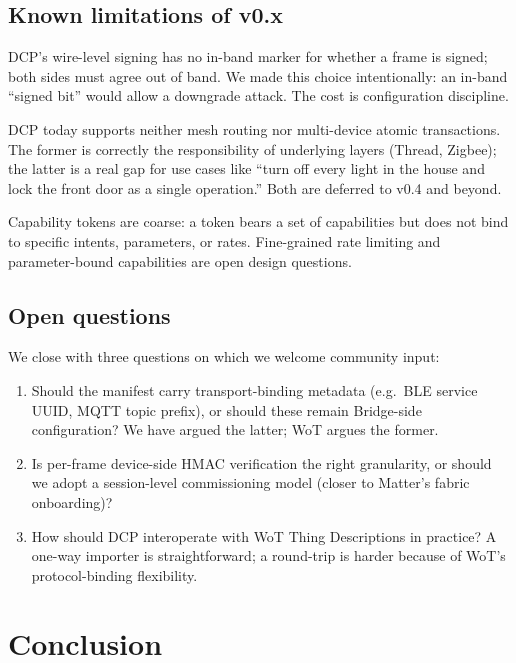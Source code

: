 \documentclass[11pt,a4paper]{article}
\begin{document}
\subsection{Known limitations of v0.x}

DCP's wire-level signing has no in-band marker for whether a frame is
signed; both sides must agree out of band. We made this choice
intentionally: an in-band ``signed bit'' would allow a downgrade attack.
The cost is configuration discipline.

DCP today supports neither mesh routing nor multi-device atomic
transactions. The former is correctly the responsibility of underlying
layers (Thread, Zigbee); the latter is a real gap for use cases like
``turn off every light in the house and lock the front door as a single
operation.'' Both are deferred to v0.4 and beyond.

Capability tokens are coarse: a token bears a set of capabilities but does
not bind to specific intents, parameters, or rates. Fine-grained rate
limiting and parameter-bound capabilities are open design questions.

\subsection{Open questions}

We close with three questions on which we welcome community input:

\begin{enumerate}[leftmargin=*,nosep]
  \item Should the manifest carry transport-binding metadata
        (e.g.\ BLE service UUID, MQTT topic prefix), or should these
        remain Bridge-side configuration? We have argued the latter; WoT
        argues the former.
  \item Is per-frame device-side HMAC verification the right granularity,
        or should we adopt a session-level commissioning model (closer
        to Matter's fabric onboarding)?
  \item How should DCP interoperate with WoT Thing Descriptions in practice?
        A one-way importer is straightforward; a round-trip is harder
        because of WoT's protocol-binding flexibility.
\end{enumerate}

\section{Conclusion}
\end{document}
